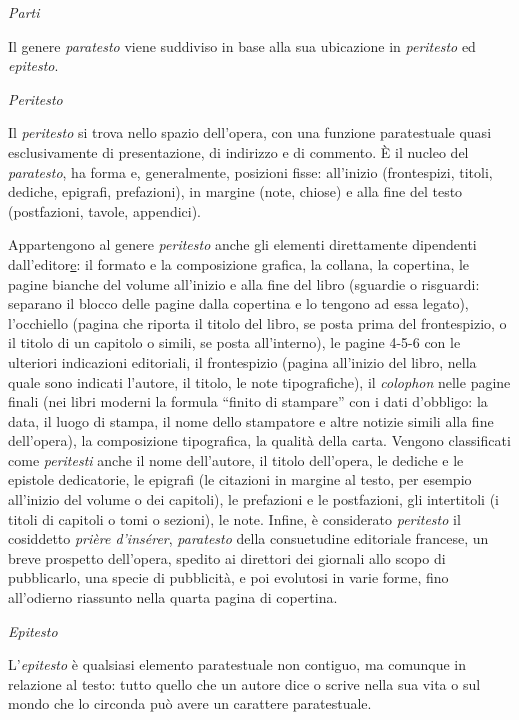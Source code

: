\documentclass[
  b5paper,
  twoside,
  12pt,
  chapterprefix=false,
  bibliography=totocnumbered,
  parskip=false]{scrbook}
\begin{document}
\emph{Parti}

Il genere \emph{paratesto} viene suddiviso in base alla sua ubicazione in
\emph{peritesto} ed \emph{epitesto}.

\emph{Peritesto}

Il \emph{peritesto} si trova nello spazio dell'opera, con una funzione
paratestuale quasi esclusivamente di presentazione, di indirizzo e di
commento. È il nucleo del \emph{paratesto}, ha forma e, generalmente,
posizioni fisse: all'inizio (frontespizi, titoli, dediche, epigrafi,
prefazioni), in margine (note, chiose) e alla fine del testo
(postfazioni, tavole, appendici).

Appartengono al genere \emph{peritesto} anche gli elementi direttamente
dipendenti dall'editor\href{https://it.wikipedia.org/wiki/Editore}{e}: il
formato e la composizione grafica, la collana, la copertina, le pagine
bianche del volume all'inizio e alla fine del libro (sguardie o
risguardi: separano il blocco delle pagine dalla copertina e lo tengono
ad essa legato), l'occhiello (pagina che riporta il titolo del libro, se
posta prima del frontespizio, o il titolo di un capitolo o simili, se
posta all'interno), le pagine 4-5-6 con le ulteriori indicazioni
editoriali, il frontespizio (pagina all'inizio del libro, nella quale
sono indicati l'autore, il titolo, le note tipografiche), il \emph{colophon}
nelle pagine finali (nei libri moderni la formula \enquote{finito di stampare}
con i dati d'obbligo: la data, il luogo di stampa, il nome dello
stampatore e altre notizie simili alla fine dell'opera), la composizione
tipografica, la qualità della carta. Vengono classificati come
\emph{peritesti} anche il nome dell'autore, il titolo dell'opera, le dediche
e le epistole dedicatorie, le epigrafi (le citazioni in margine al
testo, per esempio all'inizio del volume o dei capitoli), le prefazioni
e le postfazioni, gli intertitoli (i titoli di capitoli o tomi o
sezioni), le note. Infine, è considerato \emph{peritesto} il cosiddetto
\emph{prière d'insérer}, \emph{paratesto} della consuetudine editoriale francese,
un breve prospetto dell'opera, spedito ai direttori dei giornali allo
scopo di pubblicarlo, una specie di pubblicità, e poi evolutosi in varie
forme, fino all'odierno riassunto nella quarta pagina di copertina.

\emph{Epitesto}

L'\emph{epitesto} è qualsiasi elemento paratestuale non contiguo, ma
comunque in relazione al testo: tutto quello che un autore dice o scrive
nella sua vita o sul mondo che lo circonda può avere un carattere
paratestuale.
\end{document}

